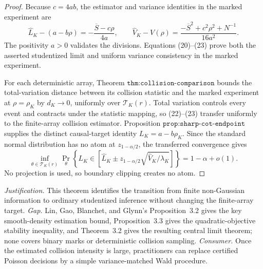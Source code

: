 \documentclass{article}
\begin{document}
\begin{proof}
Because \(c=4ab\), the estimator and variance identities in the marked
experiment are
\[
 \widehat L_K-(a-b\rho)
 =-\frac{\overline S-c\rho}{4a},
 \qquad
 \widehat V_K-V(\rho)
 =\frac{-\overline S^2+c^2\rho^2+N^{-1}}{16a^2}.
 \tag{23}
\]
The positivity \(a>0\) validates the divisions.  Equations (20)--(23)
prove both the asserted studentized limit and uniform variance
consistency in the marked experiment.

For each deterministic array, Theorem
\(\texttt{thm:collision-comparison}\) bounds the total-variation
distance between its collision statistic and the marked experiment at
\(\rho=\rho_K\) by \(d_K\to0\), uniformly over
\(\mathcal T_K(r)\).  Total variation controls every event and contracts
under the statistic mapping, so (22)--(23) transfer uniformly to the
finite-array collision estimator.  Proposition
\(\texttt{prop:sharp-cot-endpoint}\) supplies the distinct causal-target
identity \(L_K=a-b\rho_K\).  Since the standard normal distribution has
no atom at \(z_{1-\alpha/2}\), the transferred convergence gives
\[
 \inf_{\theta\in\mathcal T_K(r)}
 \Pr_\theta\!\left\{
 L_K\in
 \left[\widehat L_K\pm z_{1-\alpha/2}
 \sqrt{\widehat V_K/\lambda_K}\right]\right\}
 =1-\alpha+o(1).
 \tag{24}
\]
No projection is used, so boundary clipping creates no atom.
\end{proof}
\par\smallskip\noindent \textit{Justification.} This theorem identifies the transition from finite non-Gaussian information to ordinary studentized inference without changing the finite-array target. \textit{Gap.} Lin, Gao, Blanchet, and Glynn's Proposition~3.2 gives the key smooth-density estimation bound, Proposition~3.3 gives the quadratic-objective stability inequality, and Theorem~3.2 gives the resulting central limit theorem; none covers binary marks or deterministic collision sampling. \textit{Consumer.} Once the estimated collision intensity is large, practitioners can replace certified Poisson decisions by a simple variance-matched Wald procedure.
\end{document}

